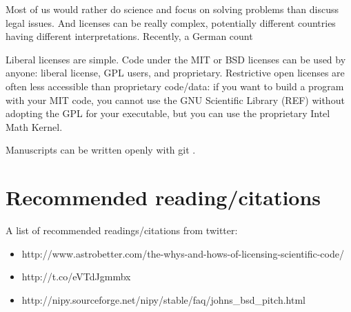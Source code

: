 \documentclass[letterpaper]{article}
\begin{document}
Most of us would rather do science and focus on solving problems than discuss
legal issues.  And licenses can be really complex, potentially different
countries having different interpretations.  Recently, a German count

Liberal licenses are simple. Code under the MIT or BSD licenses can be used by
anyone: liberal license, GPL users, and proprietary. Restrictive open licenses
are often less accessible than proprietary code/data: if you want to build a
program with your MIT code, you cannot use the GNU Scientific Library (REF)
without adopting the GPL for your executable, but you can use the proprietary
Intel Math Kernel.

Manuscripts can be written openly with git \cite{ram13}.


\section{Recommended reading/citations}

A list of recommended readings/citations from twitter:

\begin{itemize}
  \item http://www.astrobetter.com/the-whys-and-hows-of-licensing-scientific-code/
  \item http://t.co/eVTdJgmmbx
  \item http://nipy.sourceforge.net/nipy/stable/faq/johns_bsd_pitch.html
\end{itemize}



\end{document}
